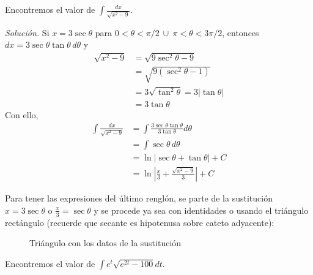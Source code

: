   \begin{ejemplo}
    Encontremos el valor de $\int\frac{dx}{\sqrt{x^{2}-9}}$.
  \end{ejemplo}

  \emph{Solución.} Si $x=3\sec \theta $ para $0< \theta <\pi/2\ \cup\ \pi< \theta< 3\pi/2$, entonces $dx=3\sec\theta\tan\theta\,d\theta $\; y
  \begin{align*}
    \sqrt{x^{2}-9}&=\sqrt{9\sec ^{2}\theta-9 }\\
    &=\sqrt{9(\sec ^{2}\theta-1 )}\\
    &=3\sqrt{\tan ^{2}\theta }=3|\tan\theta |\\
    &=3\tan \theta
  \end{align*}
  Con ello,
  \begin{align*}
    \int\frac{dx}{\sqrt{x^{2}-9}}
    &=\int \frac{3\sec\theta\tan\theta }{3\tan \theta }d\theta \\
    &=\int \sec \theta\,d\theta \\
    &=\ln\vert\sec\theta+\tan\theta\vert +C\\
    &=\ln\left|\frac{x}{3}+\frac{\sqrt{x^{2}-9}}{3}\right| +C
  \end{align*}

  Para tener las expresiones del último renglón, se parte de la sustitución $x=3\sec\theta$ o $\frac{x}{3}=\sec\theta$ y se procede ya sea con identidades o usando el triángulo rectángulo (recuerde que secante es hipotenusa sobre cateto adyacente):

  \begin{figure}[H]
    \centering
    \caption{Triángulo con los datos de la sustitución}
    \propia
  \end{figure}

  \begin{ejemplo}
    Encontremos el valor de $\int e^{t} \sqrt{e^{2t}-100}dt$.
  \end{ejemplo}

